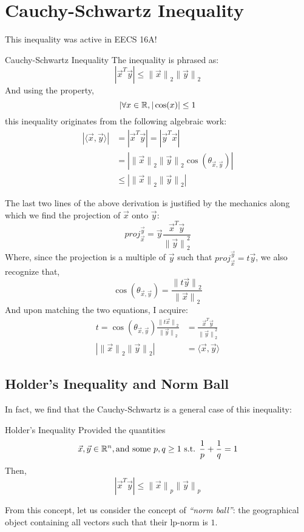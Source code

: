 \section{Cauchy-Schwartz Inequality}
This inequality was active in EECS 16A!
\begin{ln-define}{Cauchy-Schwartz Inequality}{}
    The inequality is phrased as:
    \[
        |\vec{x}^T \vec{y}| \leq {\lVert \vec{x} \rVert}_2 {\lVert \vec{y} \rVert}_2
    \]
    And using the property,
    \[|\forall x \in \mathbb{R}, |\cos(x)| \leq 1\]
    this inequality originates from the following algebraic work:
    \begin{align*}
        |\langle \vec{x}, \vec{y} \rangle| &= |\vec{x}^T \vec{y}| = |\vec{y}^T \vec{x}| \\
        &= |{\lVert \vec{x} \rVert}_2 {\lVert \vec{y} \rVert}_2 \cos(\theta_{\vec{x}, \vec{y}})| \\
        &\leq |{\lVert \vec{x} \rVert}_2 {\lVert \vec{y} \rVert}_2|
    \end{align*}
\end{ln-define}

The last two lines of the above derivation is justified by the mechanics along which we find the projection of $\vec{x}$ onto $\vec{y}$:
\[
    {proj}_{\vec{x}}^{\vec{y}} = \vec{y} \frac{\vec{x}^T\vec{y}}{{\lVert \vec{y} \rVert}_2^2}
\]
Where, since the projection is a multiple of $\vec{y}$ such that ${proj}_{\vec{x}}^{\vec{y}} = t\vec{y}$, we also recognize that,
\[
    \cos(\theta_{\vec{x}, \vec{y}}) = \frac{{\lVert t\vec{y} \rVert}_2}{{\lVert \vec{x} \rVert}_2}
\]
And upon matching the two equations, I acquire:
\begin{align*}
    t = \cos(\theta_{\vec{x}, \vec{y}}) \frac{{\lVert t\vec{x} \rVert}_2}{{\lVert \vec{y} \rVert}_2} &= \frac{\vec{x}^T\vec{y}}{{\lVert \vec{y} \rVert}_2^2} \\
    |{\lVert \vec{x} \rVert}_2 {\lVert \vec{y} \rVert}_2| &= \langle \vec{x}, \vec{y} \rangle
\end{align*}

\subsection{Holder's Inequality and Norm Ball}
In fact, we find that the Cauchy-Schwartz is a general case of this inequality:
\begin{ln-define}{Holder's Inequality}{}
    Provided the quantities
    \[\vec{x}, \vec{y} \in \mathbb{R}^n, \text{and some } p, q \geq 1 \text{ s.t. } \frac{1}{p} + \frac{1}{q} = 1\]
    Then, 
    \[|\vec{x}^T \vec{y}| \leq {\lVert \vec{x} \rVert}_p{\lVert \vec{y} \rVert}_p\]
\end{ln-define}
From this concept, let us consider the concept of \textit{``norm ball''}: the geographical object containing all vectors such that their lp-norm is $1$.

